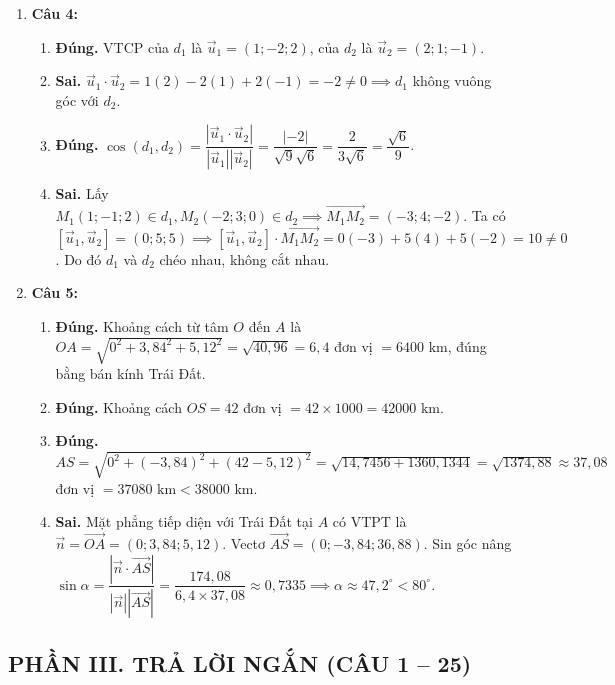 \documentclass[12pt,a4paper]{article}
\begin{document}
\begin{enumerate}
\item \textbf{Câu 4:}
\begin{enumerate}[label=\alph*)]
    \item \textbf{Đúng.} VTCP của $d_1$ là $\vec{u}_1 = (1; -2; 2)$, của $d_2$ là $\vec{u}_2 = (2; 1; -1)$.
    \item \textbf{Sai.} $\vec{u}_1 \cdot \vec{u}_2 = 1(2) - 2(1) + 2(-1) = -2 \ne 0 \implies d_1$ không vuông góc với $d_2$.
    \item \textbf{Đúng.} $\cos(d_1, d_2) = \dfrac{|\vec{u}_1 \cdot \vec{u}_2|}{|\vec{u}_1||\vec{u}_2|} = \dfrac{|-2|}{\sqrt{9}\sqrt{6}} = \dfrac{2}{3\sqrt{6}} = \dfrac{\sqrt{6}}{9}$.
    \item \textbf{Sai.} Lấy $M_1(1; -1; 2) \in d_1, M_2(-2; 3; 0) \in d_2 \implies \vec{M_1M_2} = (-3; 4; -2)$.  
    Ta có $[\vec{u}_1, \vec{u}_2] = (0; 5; 5) \implies [\vec{u}_1, \vec{u}_2] \cdot \vec{M_1M_2} = 0(-3) + 5(4) + 5(-2) = 10 \ne 0$. Do đó $d_1$ và $d_2$ chéo nhau, không cắt nhau.
\end{enumerate}

\item \textbf{Câu 5:}
\begin{enumerate}[label=\alph*)]
    \item \textbf{Đúng.} Khoảng cách từ tâm $O$ đến $A$ là $OA = \sqrt{0^2 + 3{,}84^2 + 5{,}12^2} = \sqrt{40{,}96} = 6{,}4$ đơn vị $= 6400\text{ km}$, đúng bằng bán kính Trái Đất.
    \item \textbf{Đúng.} Khoảng cách $OS = 42$ đơn vị $= 42 \times 1000 = 42000\text{ km}$.
    \item \textbf{Đúng.} $AS = \sqrt{0^2 + (-3{,}84)^2 + (42 - 5{,}12)^2} = \sqrt{14{,}7456 + 1360{,}1344} = \sqrt{1374{,}88} \approx 37{,}08$ đơn vị $= 37080\text{ km} < 38000\text{ km}$.
    \item \textbf{Sai.} Mặt phẳng tiếp diện với Trái Đất tại $A$ có VTPT là $\vec{n} = \vec{OA} = (0; 3{,}84; 5{,}12)$.  
    Vectơ $\vec{AS} = (0; -3{,}84; 36{,}88)$.  
    Sin góc nâng $\sin\alpha = \dfrac{|\vec{n} \cdot \vec{AS}|}{|\vec{n}||\vec{AS}|} = \dfrac{174{,}08}{6{,}4 \times 37{,}08} \approx 0{,}7335 \implies \alpha \approx 47{,}2^\circ < 80^\circ$.
\end{enumerate}
\end{enumerate}

\subsection*{PHẦN III. TRẢ LỜI NGẮN (CÂU 1 -- 25)}
\end{document}
